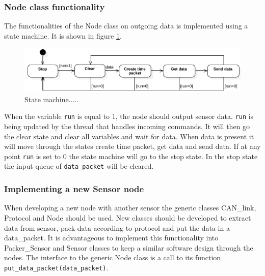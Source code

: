 \subsubsection*{Node class functionality}
The functionalities of the Node class on outgoing data is implemented using a state machine.
It is shown in figure \ref{fig:state_machine}.
\begin{figure}[!h]
\centering
\includegraphics[width=1\textwidth]{graphics/StateDiagram_Node.pdf}
\caption{State machine..... }
\label{fig:state_machine}
\end{figure}
When the variable \texttt{run} is equal to 1, the node should output sensor data.
\texttt{run} is being updated by the thread that handles incoming commands.
It will then go the clear state and clear all variables and wait for data. 
When data is present it will move through the states create time packet, get data and send data. 
If at any point \texttt{run} is set to 0 the state machine will go to the stop state.
In the stop state the input queue of \texttt{data\_packet} will be cleared.

\subsubsection*{Implementing a new Sensor node}
When developing a new node with another sensor the generic classes CAN\_link, Protocol and Node should be used. 
New classes should be developed to extract data from sensor, pack data according to protocol and put the data in a data\_packet.
It is advantageous to implement this functionality into Packer\_Sensor and Sensor classes to keep a similar software design through the nodes.
The interface to the generic Node class is a call to its function \texttt{put\_data\_packet(data\_packet)}.


















